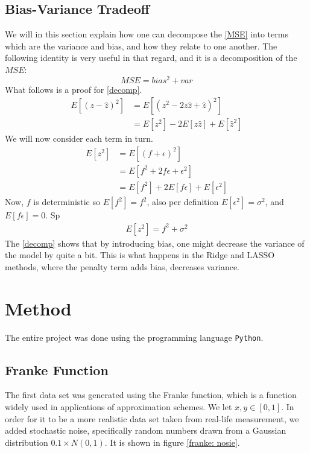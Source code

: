 \documentclass[reprint,english,notitlepage]{revtex4-1}  %
\begin{document}
\subsection{Bias-Variance Tradeoff}
We will in this section explain how one can decompose the \ref{MSE} into terms which are the variance and bias, and how they relate to one another. The following identity is very useful in that regard, and it is a decomposition of the $MSE$:
\begin{equation} \label{decomp}
	MSE = bias^2 + var
\end{equation}
What follows is a proof for \ref{decomp}.
\begin{align*}
	E \left[(z - \hat{z})^2 \right] &= E \left[(z^2 - 2z\hat{z} + \hat{z})^2 \right]\\
	&= E\left[z^2 \right] -2E\left[z\hat{z} \right] + E\left[\hat{z}^2 \right]
\end{align*}
We will now consider each term in turn.
\begin{align*}
	E\left[z^2 \right] &= E\left[(f + \epsilon)^2 \right]\\
	&= E\left[f^2 + 2f\epsilon + \epsilon^2 \right]\\
	&= E\left[f^2 \right] + 2E\left[f\epsilon \right] + E\left[\epsilon^2 \right]
\end{align*}
Now, $f$ is deterministic so $E\left[f^2 \right] = f^2$, also per definition $E\left[\epsilon^2\right] = \sigma^2$, and $E\left[f\epsilon	 \right] = 0$. Sp
\begin{align*}
	E\left[z^2 \right] = f^2 + \sigma^2	
\end{align*}
The \ref{decomp} shows that by introducing bias, one might decrease the variance of the model by quite a bit. This is what happens in the Ridge and LASSO methods, where the penalty term adds bias, decreases variance.

\section{Method}
The entire project was done using the programming language \texttt{Python}.

\subsection{Franke Function}
The first data set was generated using the Franke function, which is a function widely used in applications of approximation schemes. We let $x,y \in [0,1]$. In order for it to be a more realistic data set taken from real-life measurement, we added stochastic noise, specifically random numbers drawn from a Gaussian distribution $0.1 \times N(0,1)$. It is shown in figure \ref{franke: nosie}.
\end{document}
